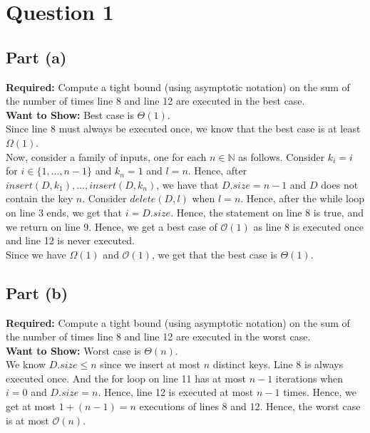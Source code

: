 \documentclass[12pt]{article}
\newcommand{\N}{\mathbb{N}}
\begin{document}

\setlength\parindent{0pt}

\section*{Question 1}

\subsection*{Part (a)}

\textbf{Required:} Compute a tight bound (using asymptotic notation) on the sum of the number of times line 8 and line 12 are executed in the best case. \\

\textbf{Want to Show:} Best case is $\Theta(1)$. \\


Since line 8 must always be executed once, we know that the best case is at least $\Omega(1)$. \\

Now, consider a family of inputs, one for each $n \in \N$ as follows. Consider $k_i = i$ for $i \in \{1,...,n-1\}$ and $k_n = 1$ and $l = n$. Hence, after $insert(D,k_1),...,insert(D,k_n)$, we have that $D.size = n-1$ and $D$ does not contain the key $n$. Consider $delete(D,l)$ when $l = n$. Hence, after the while loop on line 3 ends, we get that $i = D.size$. Hence, the statement on line 8 is true, and we return on line 9. Hence, we get a best case of $\mathcal{O}(1)$ as line 8 is executed once and line 12 is never executed. \\

Since we have $\Omega(1)$ and $\mathcal{O}(1)$, we get that the best case is $\Theta(1)$. 

\subsection*{Part (b)}

\textbf{Required:} Compute a tight bound (using asymptotic notation) on the sum of the number of times line 8 and line 12 are executed in the worst case. \\

\textbf{Want to Show:} Worst case is $\Theta(n)$. \\

We know $D.size \leq n$ since we insert at most $n$ distinct keys. Line 8 is always executed once. And the for loop on line 11 has at most $n-1$ iterations when $i = 0$ and $D.size = n$. Hence, line 12 is executed at most $n-1$ times. Hence, we get at most $1 + (n - 1) = n$ executions of lines 8 and 12. Hence, the worst case is at most $\mathcal{O}(n)$. \\
\end{document}
